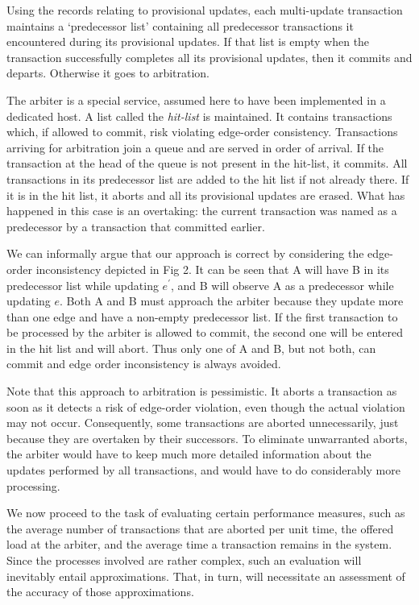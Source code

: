 \documentclass[runningheads]{llncs}
\begin{document}
Using the records relating to provisional updates, each multi-update transaction
maintains a `predecessor list' containing all predecessor transactions it encountered
during its provisional updates. If that list is empty when the transaction successfully
completes all its provisional updates, then it commits and departs. Otherwise it
goes to arbitration.

The arbiter is a special service, assumed here to have been implemented
in a dedicated host. A list called the
{\em hit-list} is maintained. It contains transactions which, if allowed to
commit, risk violating edge-order consistency. Transactions arriving for
arbitration join a queue and are served in order of arrival. If the transaction
at the head of the queue is not present in the hit-list, it commits. All
transactions in its predecessor list are added to the hit list if not already
there. If it is in the hit list, it aborts and all its provisional updates are
erased. What has happened in this case is an overtaking: the current transaction
was named as a predecessor by a transaction that committed earlier.

We can informally argue that our approach is correct by considering the edge-order
inconsistency depicted in Fig 2. It can be seen that A will have B in its predecessor
list while updating $e^\prime$, and B will observe A as a predecessor while updating
$e$. Both A and B must approach the arbiter because they update more than one edge and
have a non-empty predecessor list. If the first transaction to be processed by the arbiter
is allowed to commit, the second one will be entered in the hit list and will abort. Thus
only one of A and B, but not both, can commit and edge order inconsistency is always avoided.

Note that this approach to arbitration is pessimistic. It aborts a transaction
as soon as it detects a risk of edge-order violation, even though the actual violation
may not occur. Consequently, some
transactions are aborted unnecessarily, just because they are overtaken by
their successors. To eliminate unwarranted aborts, the arbiter would have
to keep much more detailed information about the updates performed by all
transactions, and would have to do considerably more processing.

We now proceed to the task of evaluating certain performance measures,
such as the average number of transactions that are aborted per unit time,
the offered load at the arbiter, and the average time a transaction
remains in the system. Since the processes involved are rather complex,
such an evaluation will inevitably entail approximations. That, in turn,
will necessitate an assessment of the accuracy of those approximations.
\end{document}
